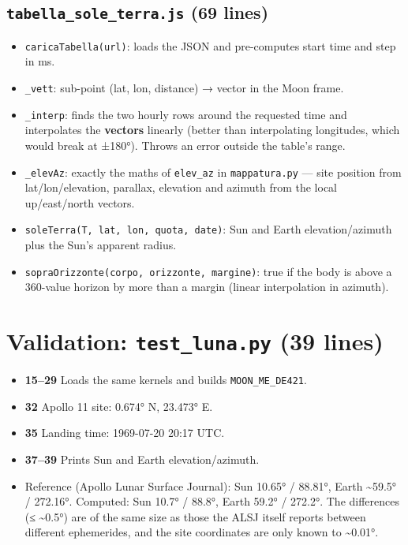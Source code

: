 \documentclass[11pt,a4paper]{article}
\providecommand{\tightlist}{\setlength{\itemsep}{0pt}\setlength{\parskip}{0pt}}
\begin{document}
\hypertarget{tabella_sole_terra.js-69-lines}{%
\subsection{\texorpdfstring{\texttt{tabella\_sole\_terra.js} (69
lines)}{tabella\_sole\_terra.js (69 lines)}}\label{tabella_sole_terra.js-69-lines}}

\begin{itemize}
\tightlist
\item
  \texttt{caricaTabella(url)}: loads the JSON and
  pre-computes start time and step in ms.
\item
  \texttt{\_vett}: sub-point (lat, lon, distance) →
  vector in the Moon frame.
\item
  \texttt{\_interp}: finds the two hourly rows around
  the requested time and interpolates the \textbf{vectors} linearly
  (better than interpolating longitudes, which would break at ±180°).
  Throws an error outside the table's range.
\item
  \texttt{\_elevAz}: exactly the maths of
  \texttt{elev\_az} in
  \texttt{mappatura.py} --- site position from
  lat/lon/elevation, parallax, elevation and azimuth from the local
  up/east/north vectors.
\item
  \texttt{soleTerra(T, lat, lon, quota, date)}: Sun and
  Earth elevation/azimuth plus the Sun's apparent radius.
\item
  \texttt{sopraOrizzonte(corpo, orizzonte, margine)}:
  true if the body is above a 360-value horizon by more than a margin
  (linear interpolation in azimuth).
\end{itemize}

\hypertarget{validation-test_luna.py-39-lines}{%
\section{\texorpdfstring{Validation: \texttt{test\_luna.py} (39
lines)}{Validation: test\_luna.py (39 lines)}}\label{validation-test_luna.py-39-lines}}

\begin{itemize}
\tightlist
\item
  \textbf{15--29} Loads the same kernels and builds
  \texttt{MOON\_ME\_DE421}.
\item
  \textbf{32} Apollo 11 site: 0.674° N, 23.473° E.
\item
  \textbf{35} Landing time: 1969-07-20 20:17 UTC.
\item
  \textbf{37--39} Prints Sun and Earth elevation/azimuth.
\item
  Reference (Apollo Lunar Surface Journal): Sun 10.65° / 88.81°, Earth
  \textasciitilde59.5° / 272.16°. Computed: Sun 10.7° / 88.8°, Earth
  59.2° / 272.2°. The differences (≤ \textasciitilde0.5°) are of the
  same size as those the ALSJ itself reports between different
  ephemerides, and the site coordinates are only known to
  \textasciitilde0.01°.
\end{itemize}
\end{document}

